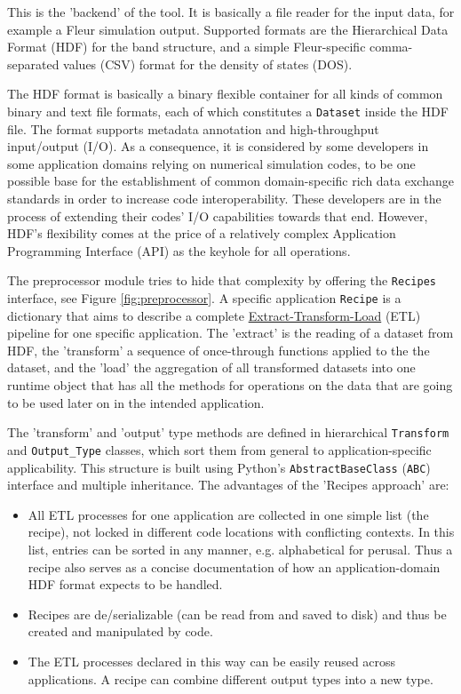 This is the 'backend' of the tool. It is basically a file reader for the input
data, for example a Fleur simulation output. Supported formats are the
Hierarchical Data Format (HDF) \cite{hdf} for the band structure, and a simple
Fleur-specific comma-separated values (CSV) format for the density of states
(DOS).

The HDF format is basically a binary flexible container for all kinds of common
binary and text file formats, each of which constitutes a \texttt{Dataset}
inside the HDF file. The format supports metadata annotation and high-throughput
input/output (I/O). As a consequence, it is considered by some developers in
some application domains relying on numerical simulation codes, to be one
possible base for the establishment of common domain-specific rich data exchange
standards in order to increase code interoperability. These developers are in
the process of extending their codes' I/O capabilities towards that end.
However, HDF's flexibility comes at the price of a relatively complex Application
Programming Interface (API) as the keyhole for all operations.

The preprocessor module tries to hide that complexity by offering the
\texttt{Recipes} interface, see Figure \ref{fig:preprocessor}. A specific
application \texttt{Recipe} is a dictionary that aims to describe a complete
\href{https://en.wikipedia.org/wiki/Extract,_transform,_load}{Extract-Transform-Load}
(ETL) pipeline for one specific application. The 'extract' is the reading of a
dataset from HDF, the 'transform' a sequence of once-through functions applied
to the the dataset, and the 'load' the aggregation of all transformed datasets
into one runtime object that has all the methods for operations on the data that
are going to be used later on in the intended application.

The 'transform' and 'output' type methods are defined in hierarchical
\texttt{Transform} and \texttt{Output\_Type} classes, which sort them from
general to application-specific applicability. This structure is built using
Python's \texttt{AbstractBaseClass} (\texttt{ABC}) interface and multiple
inheritance. The advantages of the 'Recipes approach' are:
\begin{itemize}
\item All ETL processes for one application are collected in one simple list
    (the recipe), not locked in different code locations with conflicting
    contexts. In this list, entries can be sorted in any manner, e.g.
    alphabetical for perusal. Thus a recipe also serves as a concise
    documentation of how an application-domain HDF format expects to be handled.
\item Recipes are de/serializable (can be read from and saved to disk) and thus be
    created and manipulated by code.
\item The ETL processes declared in this way can be easily reused across
    applications. A recipe can combine different output types into a new type.
\end{itemize}

